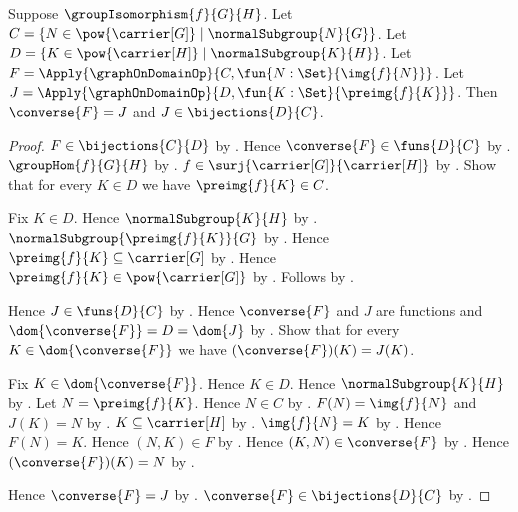 \begin{theorem}\label{group_isomorphism_normal_correspondence_inverse_graph}
    Suppose $\groupIsomorphism{f}{G}{H}$.
    Let
        $C=\{N\in\pow{\carrier[G]}\mid
            \text{$\normalSubgroup{N}{G}$}\}$.
    Let
        $D=\{K\in\pow{\carrier[H]}\mid
            \text{$\normalSubgroup{K}{H}$}\}$.
    Let
        $F=\Apply{\graphOnDomainOp}{
            C,\fun{N:\Set}{\img{f}{N}}}$.
    Let
        $J=\Apply{\graphOnDomainOp}{
            D,\fun{K:\Set}{\preimg{f}{K}}}$.
    Then $\converse{F}=J$ and $J\in\bijections{D}{C}$.
\end{theorem}
\begin{proof}
    $F\in\bijections{C}{D}$ by
        .
    Hence $\converse{F}\in\funs{D}{C}$ by
        .
    $\groupHom{f}{G}{H}$ by
        .
    $f\in\surj{\carrier[G]}{\carrier[H]}$ by
        .
    Show that for every $K\in D$ we have $\preimg{f}{K}\in C$.
    \begin{subproof}
        Fix $K\in D$.
        Hence $\normalSubgroup{K}{H}$ by \auto.
        $\normalSubgroup{\preimg{f}{K}}{G}$ by
            .
        Hence $\preimg{f}{K}\subseteq\carrier[G]$ by
            .
        Hence $\preimg{f}{K}\in\pow{\carrier[G]}$ by
            .
        Follows by \auto.
    \end{subproof}
    Hence $J\in\funs{D}{C}$ by
        .
    Hence $\converse{F}$ and $J$ are functions and
        $\dom{\converse{F}}=D=\dom{J}$ by .
    Show that for every $K\in\dom{\converse{F}}$ we have
        $(\converse{F})(K)=J(K)$.
    \begin{subproof}
        Fix $K\in\dom{\converse{F}}$.
        Hence $K\in D$.
        Hence $\normalSubgroup{K}{H}$ by \auto.
        Let $N=\preimg{f}{K}$.
        Hence $N\in C$ by \auto.
        $F(N)=\img{f}{N}$ and $J(K)=N$ by
            .
        $K\subseteq\carrier[H]$ by
            .
        $\img{f}{N}=K$ by
            .
        Hence $F(N)=K$.
        Hence $(N,K)\in F$ by
            .
        Hence $(K,N)\in\converse{F}$ by .
        Hence $(\converse{F})(K)=N$ by
            .
    \end{subproof}
    Hence $\converse{F}=J$ by .
    $\converse{F}\in\bijections{D}{C}$ by
        .
\end{proof}
